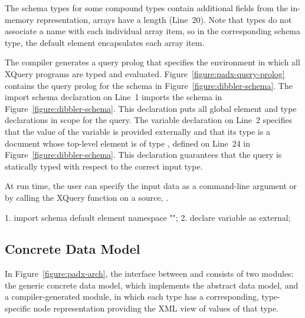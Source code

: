 The schema types for some compound types contain additional fields
from the \pads{} in-memory representation, \eg{} arrays have a length
(Line~20).  Note that  types do not associate a name with
each individual array item, so in the corresponding schema type, the
default element  encapsulates each array item.

The \pads{} compiler generates a query prolog that specifies the
environment in which all XQuery programs are typed and evaluated. 
Figure~\ref{figure:padx-query-prolog} contains the query prolog for
the schema in Figure~\ref{figure:dibbler-schema}.  The import schema
declaration on Line~1 imports the schema in
Figure~\ref{figure:dibbler-schema}.  This declaration puts all global
element and type declarations in scope for the query.  The variable
declaration on Line~2 specifies that the value of the variable
 is provided externally and that its type is a document
whose top-level element is of type , defined on Line~24 in
Figure~\ref{figure:dibbler-schema}.  This declaration guarantees
that the query is statically typed with respect to the correct input type.

At run time, the user can specify
the input data as a command-line argument or by calling the XQuery
 function on a \pads{} source, \eg{} .
\begin{figure*}
\begin{small}
\begin{code}
 1. import schema default element namespace "";
 2. declare variable  as  external; 
\end{code}
\end{small}
\caption{\padx{} generated query prolog}
\label{figure:padx-query-prolog}
\end{figure*}

\subsection{\padx{} Concrete Data Model}

In Figure~\ref{figure:padx-arch}, the interface between \Galax{} and
\pads{} consists of two modules: the generic \padx{} concrete data model,
which implements the \Galax{} abstract data model, and a
compiler-generated module, in which each \pads{} type has a
corresponding, type-specific node representation providing the XML
view of values of that type.


